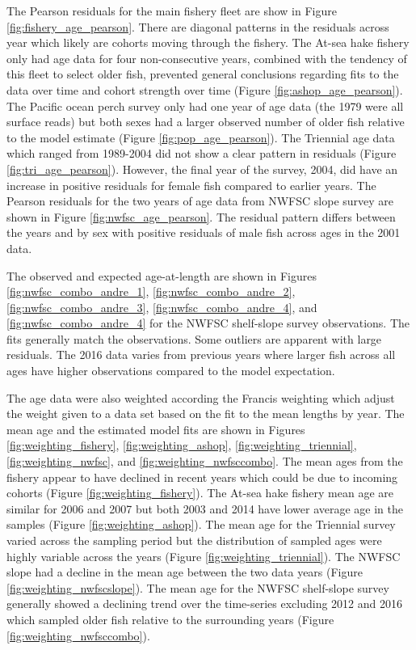 \documentclass[12pt,]{article}
\begin{document}
The Pearson residuals for the main fishery fleet are show in Figure
\ref{fig:fishery_age_pearson}. There are diagonal patterns in the
residuals across year which likely are cohorts moving through the
fishery. The At-sea hake fishery only had age data for four
non-consecutive years, combined with the tendency of this fleet to
select older fish, prevented general conclusions regarding fits to the
data over time and cohort strength over time (Figure
\ref{fig:ashop_age_pearson}). The Pacific ocean perch survey only had
one year of age data (the 1979 were all surface reads) but both sexes
had a larger observed number of older fish relative to the model
estimate (Figure \ref{fig:pop_age_pearson}). The Triennial age data
which ranged from 1989-2004 did not show a clear pattern in residuals
(Figure \ref{fig:tri_age_pearson}). However, the final year of the
survey, 2004, did have an increase in positive residuals for female fish
compared to earlier years. The Pearson residuals for the two years of
age data from NWFSC slope survey are shown in Figure
\ref{fig:nwfsc_age_pearson}. The residual pattern differs between the
years and by sex with positive residuals of male fish across ages in the
2001 data.

The observed and expected age-at-length are shown in Figures
\ref{fig:nwfsc_combo_andre_1}, \ref{fig:nwfsc_combo_andre_2},
\ref{fig:nwfsc_combo_andre_3}, \ref{fig:nwfsc_combo_andre_4}, and
\ref{fig:nwfsc_combo_andre_4} for the NWFSC shelf-slope survey
observations. The fits generally match the observations. Some outliers
are apparent with large residuals. The 2016 data varies from previous
years where larger fish across all ages have higher observations
compared to the model expectation.

The age data were also weighted according the Francis weighting which
adjust the weight given to a data set based on the fit to the mean
lengths by year. The mean age and the estimated model fits are shown in
Figures \ref{fig:weighting_fishery}, \ref{fig:weighting_ashop},
\ref{fig:weighting_triennial}, \ref{fig:weighting_nwfsc}, and
\ref{fig:weighting_nwfsccombo}. The mean ages from the fishery appear to
have declined in recent years which could be due to incoming cohorts
(Figure \ref{fig:weighting_fishery}). The At-sea hake fishery mean age
are similar for 2006 and 2007 but both 2003 and 2014 have lower average
age in the samples (Figure \ref{fig:weighting_ashop}). The mean age for
the Triennial survey varied across the sampling period but the
distribution of sampled ages were highly variable across the years
(Figure \ref{fig:weighting_triennial}). The NWFSC slope had a decline in
the mean age between the two data years (Figure
\ref{fig:weighting_nwfscslope}). The mean age for the NWFSC shelf-slope
survey generally showed a declining trend over the time-series excluding
2012 and 2016 which sampled older fish relative to the surrounding years
(Figure \ref{fig:weighting_nwfsccombo}).
\end{document}

